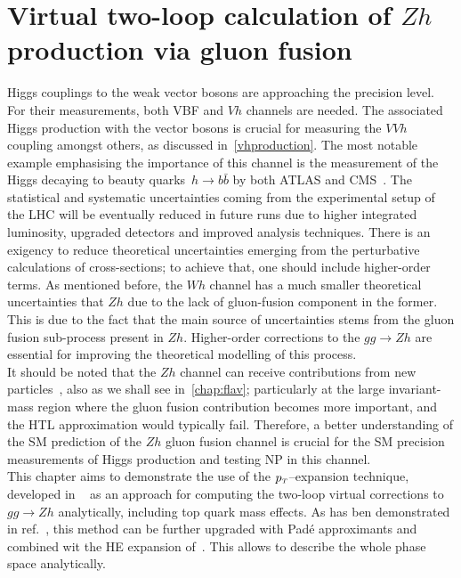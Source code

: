 \chapter{ Virtual two-loop calculation of  $Zh$ production via gluon fusion}\label{chap:hz}
\par  Higgs couplings to the weak vector bosons are approaching the precision level. For their measurements, both VBF and $Vh$ channels are needed. The associated Higgs production with the vector bosons is crucial for measuring the $VVh$ coupling amongst others, as discussed in~\autoref{vhproduction}. The most notable example emphasising the importance of this channel is the measurement of the Higgs decaying to beauty quarks~$h \rightarrow b \bar{b}$ by both ATLAS and CMS~\cite{Aaboud:2018zhk, Sirunyan:2018kst}. The statistical and systematic uncertainties coming from the experimental setup of the LHC will be eventually reduced in future runs due to higher integrated luminosity,  upgraded detectors and improved analysis techniques. There is an exigency to reduce theoretical uncertainties emerging from the perturbative calculations of cross-sections; to achieve that, one should include higher-order terms. As mentioned before, the $Wh$ channel has a much smaller theoretical uncertainties that $Zh$ due to the lack of gluon-fusion component in the former. This is due to the fact that the main source of uncertainties stems from the gluon fusion sub-process present in $Zh$. Higher-order corrections to the $gg \to Zh$ are essential for improving the theoretical modelling of this process. \\ 
It should be noted that the $Zh$ channel can receive contributions from new particles~\cite{Harlander:2013mla}, also as we shall see in~\autoref{chap:flav}; particularly at the large invariant-mass region where the gluon fusion contribution becomes more important, and the HTL approximation would typically fail. Therefore, a better understanding of the SM prediction of the $Zh$ gluon fusion channel is crucial for the SM precision measurements of Higgs production and testing NP in this channel.  \\ 
This chapter aims to demonstrate the use of the $p_{\scriptscriptstyle T}$--expansion technique, developed in ~\cite{Bonciani:2018omm} as an approach for computing the two-loop virtual corrections to $gg \to Zh$ analytically, including top quark mass effects. 
As has ben demonstrated in ref.~\cite{Bellafronte:2022jmo}, this method can be further upgraded with Pad\'e approximants and combined wit the HE expansion of~\cite{Davies:2020drs}. This allows to describe the whole phase space analytically.
